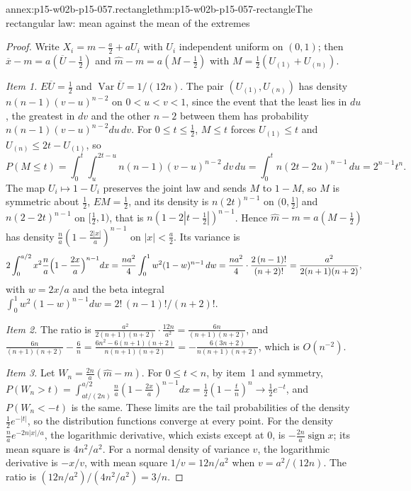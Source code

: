 \begin{annexitem}{annex:p15-w02b-p15-057.rectangle}{thm:p15-w02b-p15-057-rectangle}{The rectangular law: mean against the mean of the extremes}
\begin{proof}
Write \(X_i=m-\frac a2+aU_i\) with \(U_i\) independent uniform on
\((0,1)\); then \(\overline x-m=a(\overline U-\frac12)\) and
\(\hat m-m=a(M-\frac12)\) with \(M=\frac12(U_{(1)}+U_{(n)})\).

\emph{Item 1.} \(E\overline U=\frac12\) and
\(\operatorname{Var}\overline U=1/(12n)\). The pair
\((U_{(1)},U_{(n)})\) has density \(n(n-1)(v-u)^{n-2}\) on \(0<u<v<1\),
since the event that the least lies in \(du\), the greatest in \(dv\) and
the other \(n-2\) between them has probability
\(n(n-1)(v-u)^{n-2}du\,dv\). For \(0\leq t\leq\frac12\), \(M\leq t\)
forces \(U_{(1)}\leq t\) and \(U_{(n)}\leq2t-U_{(1)}\), so
\[
 P(M\leq t)=\int_0^t\!\int_u^{2t-u}n(n-1)(v-u)^{n-2}\,dv\,du
 =\int_0^tn(2t-2u)^{n-1}\,du=2^{n-1}t^n .
\]
The map \(U_i\mapsto1-U_i\) preserves the joint law and sends \(M\) to
\(1-M\), so \(M\) is symmetric about \(\frac12\), \(EM=\frac12\), and its
density is \(n(2t)^{n-1}\) on \((0,\frac12]\) and \(n(2-2t)^{n-1}\) on
\([\frac12,1)\), that is \(n(1-2|t-\frac12|)^{n-1}\). Hence
\(\hat m-m=a(M-\frac12)\) has density
\(\frac na(1-\frac{2|x|}a)^{n-1}\) on \(|x|<\frac a2\). Its variance is
\[
 2\int_0^{a/2}x^2\frac na\Bigl(1-\frac{2x}a\Bigr)^{n-1}dx
 =\frac{na^2}4\int_0^1w^2(1-w)^{n-1}\,dw
 =\frac{na^2}4\cdot\frac{2\,(n-1)!}{(n+2)!}
 =\frac{a^2}{2(n+1)(n+2)},
\]
with \(w=2x/a\) and the beta integral
\(\int_0^1w^2(1-w)^{n-1}dw=2!\,(n-1)!/(n+2)!\).

\emph{Item 2.} The ratio is
\(\frac{a^2}{2(n+1)(n+2)}\cdot\frac{12n}{a^2}=\frac{6n}{(n+1)(n+2)}\), and
\(\frac{6n}{(n+1)(n+2)}-\frac6n=\frac{6n^2-6(n+1)(n+2)}{n(n+1)(n+2)}
=-\frac{6(3n+2)}{n(n+1)(n+2)}\), which is \(O(n^{-2})\).

\emph{Item 3.} Let \(W_n=\frac{2n}a(\hat m-m)\). For \(0\leq t<n\), by
item~1 and symmetry,
\(P(W_n>t)=\int_{at/(2n)}^{a/2}\frac na(1-\frac{2x}a)^{n-1}dx
=\frac12(1-\frac tn)^n\to\frac12e^{-t}\), and \(P(W_n<-t)\) is the same.
These limits are the tail probabilities of the density \(\frac12e^{-|t|}\),
so the distribution functions converge at every point. For the density
\(\frac na e^{-2n|x|/a}\), the logarithmic derivative, which exists except
at \(0\), is \(-\frac{2n}a\operatorname{sign}x\); its mean square is
\(4n^2/a^2\). For a normal density of variance \(v\), the logarithmic
derivative is \(-x/v\), with mean square \(1/v=12n/a^2\) when
\(v=a^2/(12n)\). The ratio is \((12n/a^2)/(4n^2/a^2)=3/n\).
\end{proof}
\end{annexitem}


